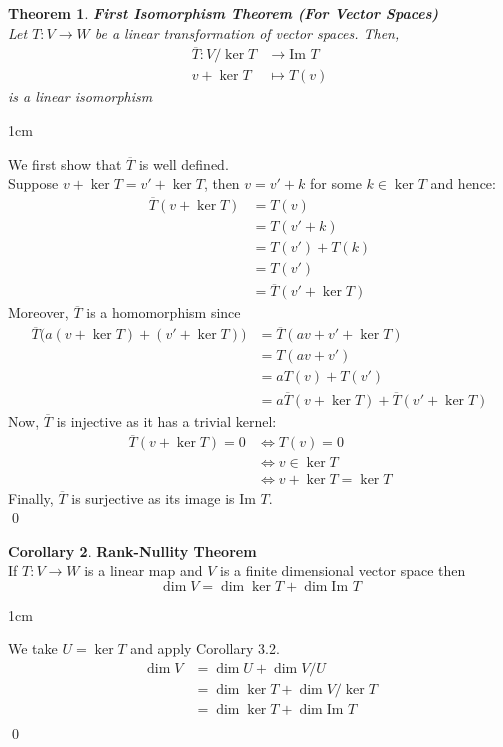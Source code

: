 \documentclass[11pt, a4paper]{report}
\makeatletter
\numberwithin{equation}{section}
\newcommand{\im}{\text{Im }}
\numberwithin{equation}{subsection}
\theoremstyle{plain}
\newtheorem{thm}{Theorem}[chapter] %
\theoremstyle{definition}
\newtheorem{cor}[thm]{Corollary}
\theoremstyle{remark}
\newtheorem*{prf}{Proof}
\renewenvironment{prf}[1][\proofname]{\par
  \vspace{-\topsep}%
  \normalfont
  \topsep0pt \partopsep0pt %
  \trivlist
  \item[\hskip\labelsep
        \itshape
    #1\@addpunct{.}]\ignorespaces
}{%
  \popQED\endtrivlist\@endpefalse
  \addvspace{6pt plus 6pt} %
}
\newcommand{\pr}[1]{\begin{adjustwidth}{1cm}{} \begin{prf} #1 \end{prf} \end{adjustwidth}}
\makeatother
\begin{document}
\newpage

\begin{thm} \textnormal{\textbf{First Isomorphism Theorem (For Vector Spaces)}}\\
Let $T: V \to W$ be a linear transformation of vector spaces. Then,
\begin{align*}
\overline{T} : V/\ker T &\to \im T\\
				v + \ker T &\mapsto T(v)
\end{align*}
is a linear isomorphism
\end{thm}
\pr{
We first show that $\overline{T}$ is well defined.\\ Suppose $v + \ker T = v' + \ker T$, then $v = v' + k$ for some $k \in \ker T$ and hence:
\begin{align*}
\overline{T}(v + \ker T) 	&= T(v)\\
							&= T(v' + k)\\
							&= T(v') + T(k)\\
							&= T(v')\\
							&= \overline{T}(v' + \ker T)
\end{align*}
Moreover, $\overline{T}$ is a homomorphism since
\begin{align*}
\overline{T}\big(a(v + \ker T) + (v' + \ker T)\big) 	&= \overline{T}(av + v' + \ker T)\\
														&= T(av + v')\\
														&= aT(v) + T(v')\\
														&= a \overline{T}(v + \ker T) + \overline{T}(v' + \ker T)
\end{align*}
Now, $\overline{T}$ is injective as it has a trivial kernel:
\begin{align*}
\overline{T}(v + \ker T) = 0 	&\iff T(v) = 0\\
								&\iff v \in \ker T\\
								&\iff v + \ker T = \ker T \tag{Since $\ker T$ is a vector subspace}
\end{align*}
Finally, $\overline{T}$ is surjective as its image is $\im T$. \\[-8pt]\qed
}

\begin{cor} \textbf{Rank-Nullity Theorem}\\
If $T: V \to W$ is a linear map and $V$ is a finite dimensional vector space then $$\dim V = \dim \ker T + \dim \im T$$
\pr{
We take $U = \ker T$ and apply Corollary 3.2.
\begin{align*}
\dim V	&= \dim U + \dim V/U\\
		&= \dim \ker T + \dim V/\ker T\\
		&= \dim \ker T + \dim \im T \tag{By First Isomorphism Theorem}\\
\end{align*} \qed
}
\end{cor}
\end{document}
